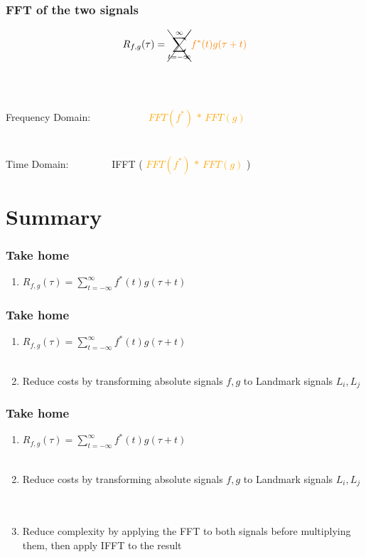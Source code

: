\documentclass{beamer}
\begin{document}
\begin{frame}
\frametitle{FFT of the two signals}
\begin{displaymath}
R_{f,g}(\tau)= \xcancel{ \sum_{ t = -\infty}^{\infty} } \textcolor{orange}{  f^*(t) g(\tau +t) }%
\end{displaymath}
\ \\
\ \\
\ \\
Frequency Domain:  \ \ \ \ \ \ \ \ \ \ \ 
\textcolor{orange}{$FFT(f^*)$ \textbf{$*$} $FFT(g)$} 
\ \\
\ \\
\ \\
Time Domain: \ \ \ \ \ \ \ \  IFFT ( \textcolor{orange}{$FFT(f^*)$ \textbf{$*$} $FFT(g)$} )
\end{frame}




\section{Summary}
\begin{frame}
\frametitle{Take home}
\begin{enumerate}
\item $R_{f,g}(\tau)= \sum_{ t = -\infty}^{\infty}  f^*(t) g(\tau +t)$ %
\end{enumerate}
\end{frame}

\begin{frame}
\frametitle{Take home}
\begin{enumerate}
\item $R_{f,g}(\tau)= \sum_{ t = -\infty}^{\infty}  f^*(t) g(\tau +t)$ %
\ \\
\ \\
\item Reduce costs by transforming absolute signals $f, g$ to Landmark signals $L_i, L_j$
\end{enumerate}
\end{frame}

\begin{frame}
\frametitle{Take home}
\begin{enumerate}
\item $R_{f,g}(\tau)= \sum_{ t = -\infty}^{\infty}  f^*(t) g(\tau +t)$ %
\ \\
\ \\
\item Reduce costs by transforming absolute signals $f, g$ to Landmark signals $L_i, L_j$
\ \\
\ \\
\item Reduce complexity by applying the FFT to both signals before multiplying them, then apply IFFT to the result
\end{enumerate}
\end{frame}
\end{document}
